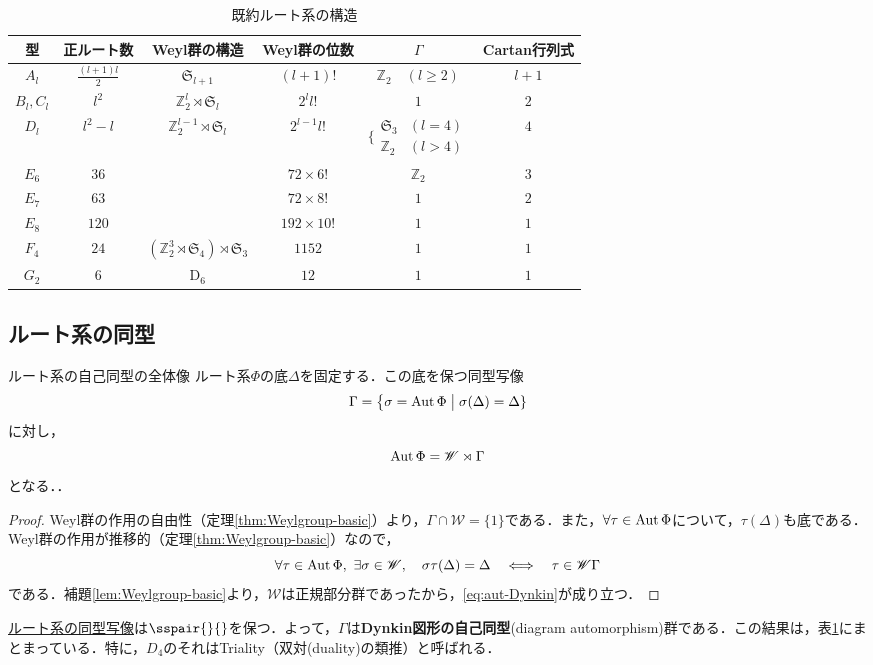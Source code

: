 \documentclass[rep_main]{subfiles}
\begin{document}
\begin{table}
	\centering
	\caption{既約ルート系の構造}
	\label{tab:rootstructure}
	\begin{tabular}{cccccc}
		型 & 正ルート数 & Weyl群の構造 & Weyl群の位数 & $\Gamma$ & Cartan行列式 \\
		\hline
		$A_l$ & $\frac{(l+1)l}{2}$ & $\mathfrak{S}_{l+1}$ & $(l+1)!$ & $\mathbb{Z}_2\quad  (l \geq 2)$ & $l+1$ \\
		$B_l,C_l$ & $l^2$ & $\mathbb{Z}_2^l \rtimes \mathfrak{S}_l$ & $2^l l!$ & $1$ & $2$ \\
		$D_l$ & $l^2 - l$ & $\mathbb{Z}_2^{l-1} \rtimes \mathfrak{S}_l$ & $2^{l-1}l!$ & $\Biggl\{\begin{array}{ll}
			\mathfrak{S}_3 &(l=4) \\
			\mathbb{Z}_2 &(l>4)
		\end{array}$ & $4$ \\
		$E_6$ & $36$ &  & $72\times6!$ & $\mathbb{Z}_2$ & $3$ \\
		$E_7$ & $63$ &  & $72\times8!$ & $1$ & $2$ \\
		$E_8$ & $120$ &  & $192\times10!$ & $1$ & $1$ \\
		$F_4$ & $24$ & $(\mathbb{Z}_2^3 \rtimes \mathfrak{S}_4) \rtimes \mathfrak{S}_3$ & $1152$ & $1$ & $1$ \\
		$G_2$ & $6$ & $\mathrm{D}_6$ & $12$ & $1$ & $1$
	\end{tabular}
\end{table}

\subsection{ルート系の同型}
\begin{mytheo}[label=thm:aut-Dynkin]{ルート系の自己同型の全体像}
	ルート系$\Phi$の底$\Delta$を固定する．この底を保つ同型写像
	\begin{equation}
		\Gamma = \bigl\{ \sigma = \operatorname{Aut} \Phi \bigm| \sigma(\Delta) = \Delta \}
	\end{equation}
	に対し，
	\begin{equation}
		\label{eq:aut-Dynkin}
		\operatorname{Aut}\Phi = \mathscr{W} \rtimes \Gamma
	\end{equation}
	となる．．
\end{mytheo}
\begin{proof}
	Weyl群の作用の自由性（定理\ref{thm:Weylgroup-basic}）より，$\Gamma \cap \mathscr{W} = \{1\}$である．また，$\forall \tau \in \operatorname{Aut}\Phi$について，$\tau(\Delta)$も底である．Weyl群の作用が推移的（定理\ref{thm:Weylgroup-basic}）なので，
	\begin{equation}
		\forall \tau \in \operatorname{Aut}\Phi,\ \exists \sigma \in \mathscr{W},\quad  \sigma\tau(\Delta) = \Delta  \quad \Longleftrightarrow \quad  \tau \in \mathscr{W}\Gamma
	\end{equation}
	である．補題\ref{lem:Weylgroup-basic}より，$\mathscr{W}$は正規部分群であったから，\eqref{eq:aut-Dynkin}が成り立つ．
\end{proof}
\hyperref[def:isom-root]{ルート系の同型写像}は$\sspair{}{}$を保つ．よって，$\Gamma$は\textbf{Dynkin図形の自己同型}(diagram automorphism)群である．この結果は，表\ref{tab:rootstructure}にまとまっている．特に，$D_4$のそれはTriality（双対(duality)の類推）と呼ばれる．
\end{document}
